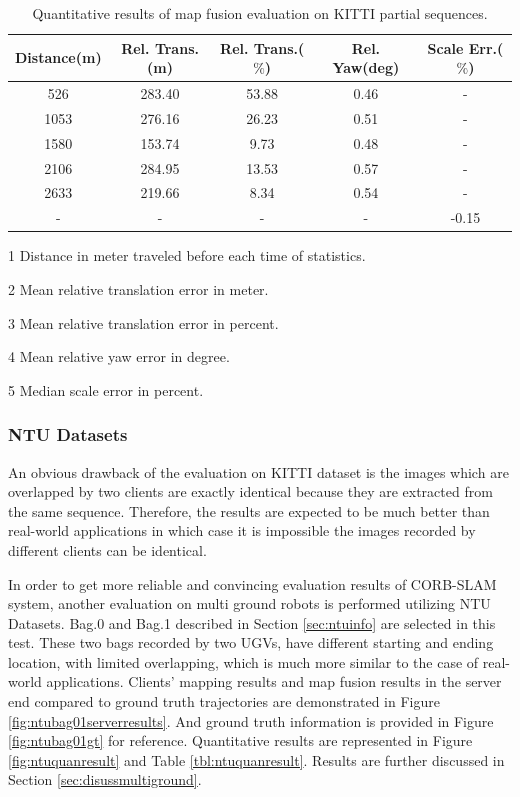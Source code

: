 \begin{table}
	\centering
	\caption{Quantitative results of map fusion evaluation on KITTI partial sequences.}
	\begin{threeparttable}
	\begin{tabular}{|c|c|c|c|c|}
		\hline
		Distance(m)\tnote{1} & Rel. Trans.(m)\tnote{2}  & Rel. Trans.($\%$)\tnote{3} & Rel. Yaw(deg)\tnote{4} & Scale Err.($\%$)\tnote{5}  \\
		\hline
		526& 283.40 & 53.88 & 0.46& - \\
		\hline
		1053&276.16& 26.23 & 0.51 & - \\
		\hline
		1580&153.74& 9.73 & 0.48 & - \\
		\hline
		2106&284.95& 13.53 & 0.57 & - \\
		\hline
		2633&219.66& 8.34 & 0.54 & - \\
		\hline
		-&-&- & - &  -0.15\\
		\hline
	\end{tabular}
      \begin{tablenotes}
		\footnotesize
		\item[1] Distance in meter traveled before each time of statistics. 
		\item[2] Mean relative translation error in meter.
		\item[3] Mean relative translation error in percent.
		\item[4] Mean relative yaw error in degree.
		\item[5] Median scale error in percent.
	\end{tablenotes}
	\end{threeparttable}
	\label{tbl:kittiquanresult}
\end{table}

\subsubsection{NTU Datasets}

An obvious drawback of the evaluation on KITTI dataset is the images which are overlapped by two clients are exactly identical because they are extracted from the same sequence. Therefore, the results are expected to be much better than real-world applications in which case it is impossible the images recorded by different clients can be identical.

In order to get more reliable and convincing evaluation results of  CORB-SLAM system, another evaluation on multi ground robots is performed utilizing NTU Datasets. Bag.0 and Bag.1 described in Section \ref{sec:ntuinfo} are selected in this test. These two bags recorded by two UGVs, have different starting and ending location, with limited overlapping, which is much more similar to the case of real-world applications. Clients' mapping results and map fusion results in the server end compared to ground truth trajectories are demonstrated in Figure \ref{fig:ntubag01serverresults}. And ground truth information is provided in Figure \ref{fig:ntubag01gt} for reference. Quantitative results are represented in Figure \ref{fig:ntuquanresult} and Table \ref{tbl:ntuquanresult}. Results are further discussed in Section \ref{sec:disussmultiground}.

